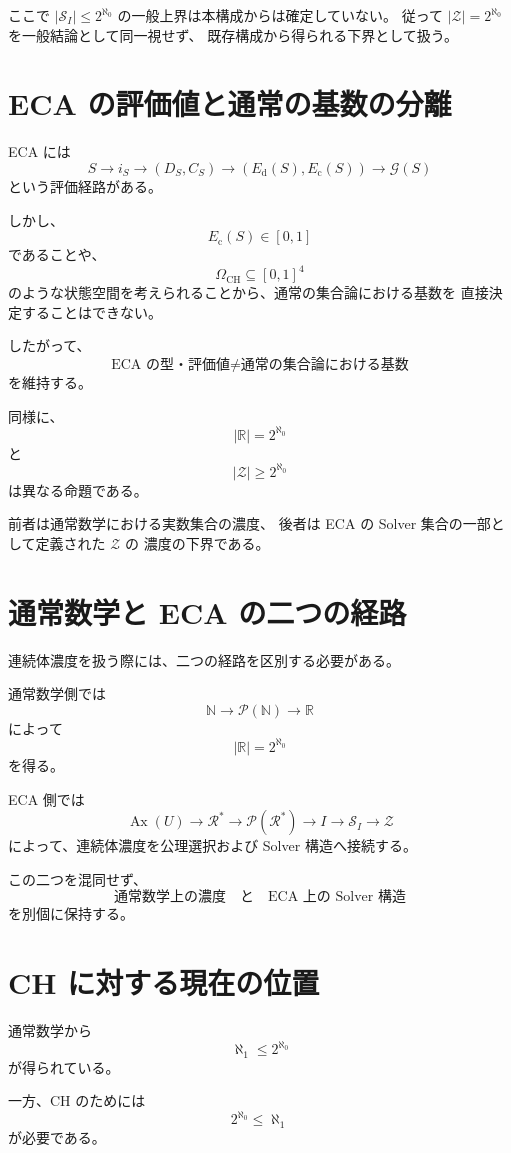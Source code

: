\documentclass[11pt,a4paper]{article}
\newcommand{\Pow}{\mathcal P}
\newcommand{\Solver}{\mathcal S}
\newcommand{\Zset}{\mathcal Z}
\newcommand{\Rstar}{\mathcal R^*}
\newcommand{\N}{\mathbb N}
\newcommand{\R}{\mathbb R}
\begin{document}
ここで $|\Solver_I|\leq2^{\aleph_0}$ の一般上界は本構成からは確定していない。
従って $|\Zset|=2^{\aleph_0}$ を一般結論として同一視せず、
既存構成から得られる下界として扱う。

\section{ECA の評価値と通常の基数の分離}

ECA には
\[
S\longrightarrow i_S
\longrightarrow(D_S,C_S)
\longrightarrow
(E_{\mathrm d}(S),E_{\mathrm c}(S))
\longrightarrow
\mathcal G(S)
\]
という評価経路がある。

しかし、
\[
E_{\mathrm c}(S)\in[0,1]
\]
であることや、
\[
\Omega_{\mathrm{CH}}\subseteq[0,1]^4
\]
のような状態空間を考えられることから、通常の集合論における基数を
直接決定することはできない。

したがって、
\[
\boxed{
\text{ECA の型・評価値}
\neq
\text{通常の集合論における基数}
}
\]
を維持する。

同様に、
\[
|\R|=2^{\aleph_0}
\]
と
\[
|\Zset|\geq2^{\aleph_0}
\]
は異なる命題である。

前者は通常数学における実数集合の濃度、
後者は ECA の Solver 集合の一部として定義された $\Zset$ の
濃度の下界である。

\section{通常数学と ECA の二つの経路}

連続体濃度を扱う際には、二つの経路を区別する必要がある。

通常数学側では
\[
\N\longrightarrow\Pow(\N)\longrightarrow\R
\]
によって
\[
|\R|=2^{\aleph_0}
\]
を得る。

ECA 側では
\[
\operatorname{Ax}(U)
\longrightarrow
\Rstar
\longrightarrow
\Pow(\Rstar)
\longrightarrow
I
\longrightarrow
\Solver_I
\longrightarrow
\Zset
\]
によって、連続体濃度を公理選択および Solver 構造へ接続する。

この二つを混同せず、
\[
\boxed{
\text{通常数学上の濃度}
\quad\text{と}\quad
\text{ECA 上の Solver 構造}
}
\]
を別個に保持する。

\section{CH に対する現在の位置}

通常数学から
\[
\aleph_1\leq2^{\aleph_0}
\]
が得られている。

一方、CH のためには
\[
2^{\aleph_0}\leq\aleph_1
\]
が必要である。
\end{document}
